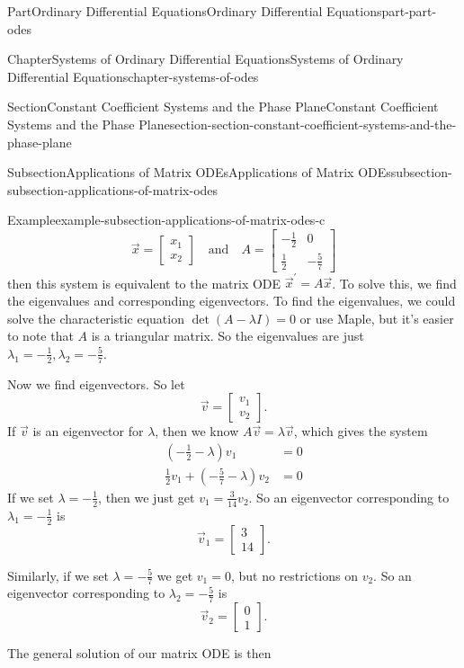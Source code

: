 \documentclass[twoside,10pt,]{book}
\numberwithin{equation}{part}
\newcommand{\qq}[1]{\quad\text{#1}\quad}
\begin{document}
\begin{partptx}{Part}{Ordinary Differential Equations}{}{Ordinary Differential Equations}{}{}{part-part-odes}
\begin{chapterptx}{Chapter}{Systems of Ordinary Differential Equations}{}{Systems of Ordinary Differential Equations}{}{}{chapter-systems-of-odes}
\begin{sectionptx}{Section}{Constant Coefficient Systems and the Phase Plane}{}{Constant Coefficient Systems and the Phase Plane}{}{}{section-section-constant-coefficient-systems-and-the-phase-plane}
\begin{subsectionptx}{Subsection}{Applications of Matrix ODEs}{}{Applications of Matrix ODEs}{}{}{subsection-subsection-applications-of-matrix-odes}
\begin{example}{Example}{}{example-subsection-applications-of-matrix-odes-c}
\begin{equation*}
\vec{x} = \begin{bmatrix} x_{1} \\ x_{2} \end{bmatrix} \qq{and} A = \begin{bmatrix}-\frac{1}{2} &  0 \\ \frac{1}{2} &  -\frac{5}{7}\end{bmatrix}
\end{equation*}
then this system is equivalent to the matrix ODE \(\vec{x}^\prime = A\vec{x}\). To solve this, we find the eigenvalues and corresponding eigenvectors. To find the eigenvalues, we could solve the characteristic equation \(\det(A-\lambda I) = 0\) or use Maple, but it's easier to note that \(A\) is a triangular matrix. So the eigenvalues are just \(\lambda_{1} = -\frac{1}{2},\lambda_{2} = -\frac{5}{7}\).%
\par
Now we find eigenvectors. So let%
\begin{equation*}
\vec{v} = \begin{bmatrix}v_{1} \\ v_{2}\end{bmatrix}.
\end{equation*}
If \(\vec{v}\) is an eigenvector for \(\lambda\), then we know \(A\vec{v} = \lambda\vec{v}\), which gives the system%
\begin{align*}
(-\frac{1}{2}-\lambda)v_{1} & = 0\\
\frac{1}{2}v_{1} + (-\frac{5}{7}-\lambda)v_{2} & = 0
\end{align*}
If we set \(\lambda=-\frac{1}{2}\), then we just get \(v_{1} = \frac{3}{14}v_{2}\). So an eigenvector corresponding to \(\lambda_{1} = -\frac{1}{2}\) is%
\begin{equation*}
\vec{v}_{1} = \begin{bmatrix}3\\14\end{bmatrix}.
\end{equation*}
%
\par
Similarly, if we set \(\lambda=-\frac{5}{7}\) we get \(v_{1} = 0\), but no restrictions on \(v_{2}\). So an eigenvector corresponding to \(\lambda_{2} = -\frac{5}{7}\) is%
\begin{equation*}
\vec{v}_{2} = \begin{bmatrix}0\\1\end{bmatrix}.
\end{equation*}
%
\par
The general solution of our matrix ODE is then%

\end{example}
\end{subsectionptx}
\end{sectionptx}
\end{chapterptx}
\end{partptx}
\end{document}
